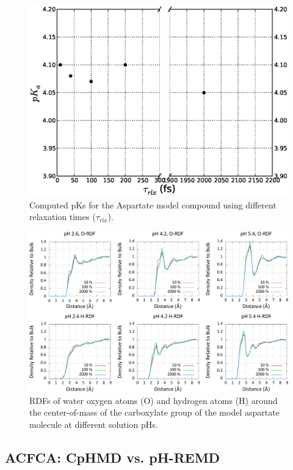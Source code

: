 \begin{figure}
   \includegraphics[width=6.5in]{pKaplot.ps}
   \caption{Computed pKs for the Aspartate model compound using different
            relaxation times ($\tau_{rlx}$).}
   \label{fig4:pKaplot}
\end{figure}

\begin{figure}
   \includegraphics[width=6.5in]{ntrelax_radial_ph.eps}
   \caption{RDFs of water oxygen atoms (O) and hydrogen atoms (H) around the
            center-of-mass of the carboxylate group of the model aspartate
            molecule at different solution pHs.}
   \label{fig4:ntrelax_rdfs}
\end{figure}

\subsection{ACFCA: CpHMD vs. pH-REMD}

